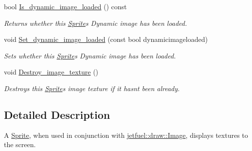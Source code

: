 \begin{DoxyCompactItemize}
bool \hyperlink{classjetfuel_1_1draw_1_1Sprite_a06c4dbfd70dc6d52c2cea3d3f624fe83}{Is\+\_\+dynamic\+\_\+image\+\_\+loaded} () const
\begin{DoxyCompactList}\small\item\em Returns whether this \hyperlink{classjetfuel_1_1draw_1_1Sprite}{Sprite}\textquotesingle{}s Dynamic image has been loaded. \end{DoxyCompactList}\item 
void \hyperlink{classjetfuel_1_1draw_1_1Sprite_a56b760bfd2717c203c64827128132ef8}{Set\+\_\+dynamic\+\_\+image\+\_\+loaded} (const bool dynamicimageloaded)
\begin{DoxyCompactList}\small\item\em Sets whether this \hyperlink{classjetfuel_1_1draw_1_1Sprite}{Sprite}\textquotesingle{}s Dynamic image has been loaded. \end{DoxyCompactList}\item 
void \hyperlink{classjetfuel_1_1draw_1_1Sprite_ad429e62219ac70a4285cc938f7f06800}{Destroy\+\_\+image\+\_\+texture} ()
\begin{DoxyCompactList}\small\item\em Destroys this \hyperlink{classjetfuel_1_1draw_1_1Sprite}{Sprite}\textquotesingle{}s image texture if it hasn\textquotesingle{}t been already. \end{DoxyCompactList}\end{DoxyCompactItemize}


\subsection{Detailed Description}
A \hyperlink{classjetfuel_1_1draw_1_1Sprite}{Sprite}, when used in conjunction with \hyperlink{classjetfuel_1_1draw_1_1Image}{jetfuel\+::draw\+::\+Image}, displays textures to the screen.

